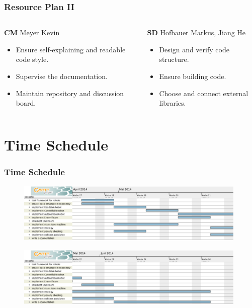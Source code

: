 \documentclass[hyperref={pdfpagelabels=false}]{beamer}
\begin{document}
\begin{frame}
	\frametitle{Resource Plan II}
	\begin{columns}[t]
		\begin{column}{0.50\textwidth}
			\begin{block}{\textbf{CM} Meyer Kevin}
				\begin{itemize}
					\item Ensure self-explaining and readable code style.
					\item Supervise the documentation.
					\item Maintain repository and discussion board.
				\end{itemize}
			\end{block}
		\end{column}
		
		\begin{column}{0.50\textwidth}
			\begin{block}{\textbf{SD} Hofbauer Markus, Jiang He}
				\begin{itemize}
					\item Design and verify code structure.
					\item Ensure building code.
					\item Choose and connect external libraries.
				\end{itemize}
			\end{block}
		\end{column}
	\end{columns}
\end{frame}

\section{Time Schedule} 
\begin{frame}
	\frametitle{Time Schedule} 
	\begin{figure}
		\centering
		\includegraphics[width = 0.98\textwidth]{g1}
	\end{figure}
	\begin{figure}
		\centering
		\includegraphics[width = 0.98\textwidth]{g2}
	\end{figure}
	
\end{frame}
\end{document}
